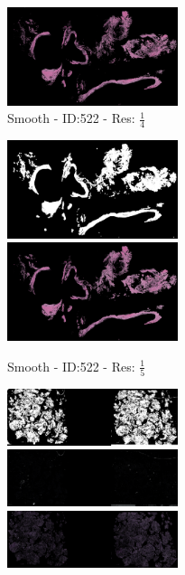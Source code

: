 \documentclass[letterpaper,10pt,oneside]{article}
\begin{document}
\begin{figure}[hbtp]
\begin{subfigure}[b]{5cm}
    \includegraphics[width=5cm]{visualization/results/smoothhistogram/res_reduce_4/Region_1_PO13-00522A1_1_2_201305171639.png}
    \caption{Smooth - ID:522 - Res: $\frac{1}{4}$}
  \end{subfigure}
  \begin{subfigure}[b]{5cm}
    \includegraphics[width=5cm]{visualization/results/smoothhistogram/res_reduce_5/Region_0_PO13-00522A1_1_2_201305171639.png}
    \includegraphics[width=5cm]{visualization/results/smoothhistogram/res_reduce_5/Region_1_PO13-00522A1_1_2_201305171639.png}
    \caption{Smooth - ID:522 - Res: $\frac{1}{5}$}
  \end{subfigure}
  \begin{subfigure}[b]{5cm}
    \includegraphics[width=5cm]{visualization/results/smoothhistogram/res_reduce_3/Region_0_PO14-00482B3_1_2_201404171123.png}
    \includegraphics[width=5cm]{visualization/results/smoothhistogram/res_reduce_3/Region_1_PO14-00482B3_1_2_201404171123.png}
    \includegraphics[width=5cm]{visualization/results/smoothhistogram/res_reduce_3/Region_2_PO14-00482B3_1_2_201404171123.png}

\end{subfigure}
\end{figure}
\end{document}
